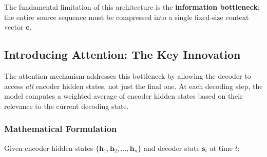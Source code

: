 \documentclass[11pt]{article}
\begin{document}
The fundamental limitation of this architecture is the \textbf{information bottleneck}: the entire source sequence must be compressed into a single fixed-size context vector $\mathbf{c}$.

\subsection{Introducing Attention: The Key Innovation}

The attention mechanism addresses this bottleneck by allowing the decoder to access \textit{all} encoder hidden states, not just the final one. At each decoding step, the model computes a weighted average of encoder hidden states based on their relevance to the current decoding state.

\subsubsection{Mathematical Formulation}

Given encoder hidden states $\{\mathbf{h}_1, \mathbf{h}_2, ..., \mathbf{h}_n\}$ and decoder state $\mathbf{s}_t$ at time $t$:
\end{document}
